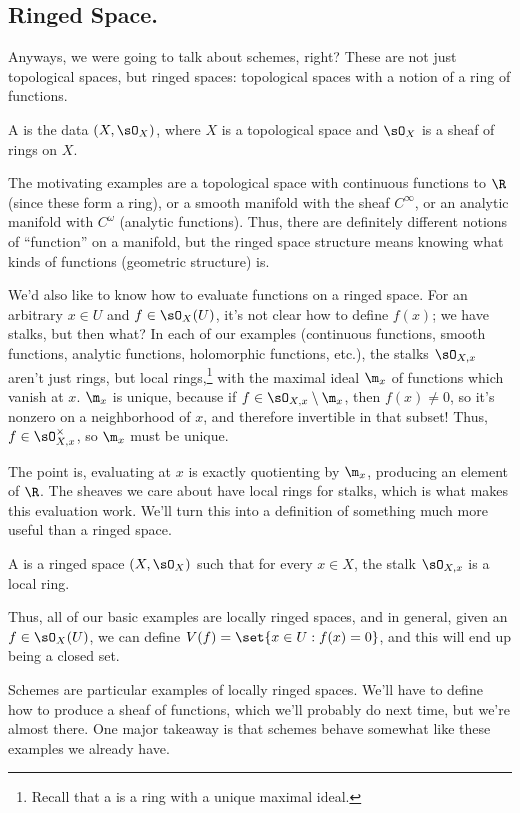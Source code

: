 \subsection*{Ringed Space.}
Anyways, we were going to talk about schemes, right? These are not just topological spaces, but ringed spaces:
topological spaces with a notion of a ring of functions.
\begin{defn}
A  is the data \((X,\sO_X)\), where \(X\) is a topological space and \(\sO_X\) is a sheaf of
rings on \(X\).
\end{defn}
The motivating examples are a topological space with continuous functions to \(\R\) (since these form a ring), or a
smooth manifold with the sheaf \(C^\infty\), or an analytic manifold with \(C^\omega\) (analytic functions).  Thus,
there are definitely different notions of ``function'' on a manifold, but the ringed space structure means knowing
what kinds of functions (geometric structure) is.

We'd also like to know how to evaluate functions on a ringed space. For an arbitrary \(x\in U\) and
\(f\in\sO_X(U)\), it's not clear how to define \(f(x)\); we have stalks, but then what? In each of our examples
(continuous functions, smooth functions, analytic functions, holomorphic functions, etc.), the stalks \(\sO_{X,x}\)
aren't just rings, but local rings,\footnote{Recall that a  is a ring with a unique maximal
ideal.} with the maximal ideal \(\m_x\) of functions which vanish at \(x\). \(\m_x\) is unique, because if
\(f\in\sO_{X,x}\setminus\m_x\), then \(f(x)\ne 0\), so it's nonzero on a neighborhood of \(x\), and therefore
invertible in that subset! Thus, \(f\in\sO_{X,x}^\times\), so \(\m_x\) must be unique.

The point is, evaluating at \(x\) is exactly quotienting by \(\m_x\), producing an element of \(\R\). The sheaves
we care about have local rings for stalks, which is what makes this evaluation work. We'll turn this into a
definition of something much more useful than a ringed space.
\begin{defn}
A  is a ringed space \((X,\sO_X)\) such that for every \(x\in X\), the stalk
\(\sO_{X,x}\) is a local ring.
\end{defn}
Thus, all of our basic examples are locally ringed spaces, and in general, given an \(f\in\sO_X(U)\), we can define
\(V(f) = \set{x\in U: f(x) = 0}\), and this will end up being a closed set.

Schemes are particular examples of locally ringed spaces. We'll have to define how to produce a sheaf of functions,
which we'll probably do next time, but we're almost there. One major takeaway is that schemes behave somewhat like
these examples we already have.

